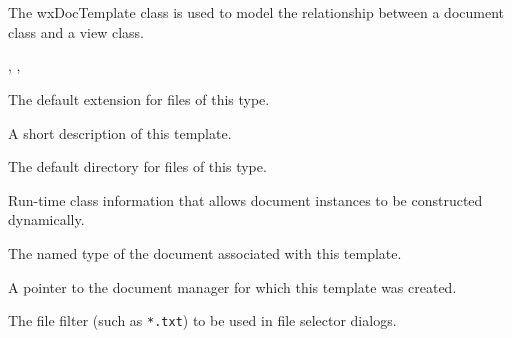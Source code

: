 \section{}\label{wxdoctemplate}

The wxDocTemplate class is used to model the relationship between a
document class and a view class.




, , 




The default extension for files of this type.



A short description of this template.



The default directory for files of this type.



Run-time class information that allows document instances to be constructed dynamically.



The named type of the document associated with this template.



A pointer to the document manager for which this template was created.



The file filter (such as \verb$*.txt$) to be used in file selector dialogs.

